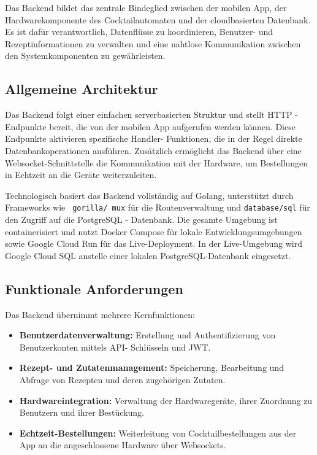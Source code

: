 Das Backend bildet das zentrale Bindeglied zwischen der mobilen App, der Hardwarekomponente des 
Cocktailautomaten und der cloudbasierten Datenbank. Es ist dafür verantwortlich, Datenflüsse zu 
koordinieren, Benutzer- und Rezeptinformationen zu verwalten und eine nahtlose Kommunikation 
zwischen den Systemkomponenten zu gewährleisten.

\subsection{Allgemeine Architektur}

Das Backend folgt einer einfachen serverbasierten Struktur und stellt HTTP - Endpunkte bereit, die 
von der mobilen App aufgerufen werden können. Diese Endpunkte aktivieren spezifische Handler-
Funktionen, die in der Regel direkte Datenbankoperationen ausführen. Zusätzlich ermöglicht das 
Backend über eine Websocket-Schnittstelle die Kommunikation mit der Hardware, um Bestellungen in 
Echtzeit an die Geräte weiterzuleiten.

Technologisch basiert das Backend vollständig auf Golang, unterstützt durch Frameworks wie \texttt{
gorilla/ mux} für die Routenverwaltung und \texttt{database/sql} für den Zugriff auf die PostgreSQL 
- Datenbank. Die gesamte Umgebung ist containerisiert und nutzt Docker Compose für lokale 
Entwicklungsumgebungen sowie Google Cloud Run für das Live-Deployment. In der Live-Umgebung wird 
Google Cloud SQL anstelle einer lokalen PostgreSQL-Datenbank eingesetzt.

\subsection{Funktionale 
Anforderungen}

Das Backend übernimmt mehrere Kernfunktionen:

\begin{itemize}
	\item \textbf{Benutzerdatenverwaltung:} Erstellung und Authentifizierung von Benutzerkonten 
	mittels API- Schlüsseln und JWT.
	\item \textbf{Rezept- und Zutatenmanagement:} Speicherung, Bearbeitung und Abfrage von Rezepten 
	und deren zugehörigen Zutaten.
	\item \textbf{Hardwareintegration:} Verwaltung der Hardwaregeräte, ihrer Zuordnung zu Benutzern 
	und ihrer Bestückung.
	\item \textbf{Echtzeit-Bestellungen:} Weiterleitung von Cocktailbestellungen aus der App an die 
	angeschlossene Hardware über Websockets.
\end{itemize}

